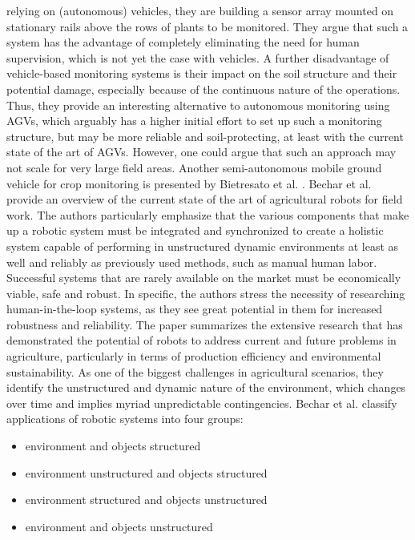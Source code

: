 \documentclass[english, master, utf8]{base/thesis_KBS}
\begin{document}
relying on (autonomous) vehicles, they are building a sensor array mounted on stationary rails above the rows of plants to be monitored. They argue that such a system has the
advantage of completely eliminating the need for human supervision, which is not yet the case with vehicles. A further disadvantage of vehicle-based monitoring systems is their
impact on the soil structure and their potential damage, especially because of the continuous nature of the operations. \cite{Virlet:2016} Thus, they provide an interesting
alternative to autonomous monitoring using AGVs, which arguably has a higher initial effort to set up such a monitoring structure, but may be more reliable and soil-protecting,
at least with the current state of the art of AGVs. However, one could argue that such an approach may not scale for very large field areas.\newline 
Another semi-autonomous mobile ground vehicle for crop monitoring is presented by Bietresato et al. \cite{Bietresato:2016}.\newline
Bechar et al. \cite{Bechar:2016} provide an overview of the current state of the art of agricultural robots for field work. The authors particularly emphasize that the various
components that make up a robotic system must be integrated and synchronized to create a holistic system capable of performing in unstructured dynamic environments at least as
well and reliably as previously used methods, such as manual human labor. Successful systems that are rarely available on the market must be economically viable, safe and robust.
\cite{Bechar:2016} In specific, the authors stress the necessity of researching human-in-the-loop systems, as they see great potential in them for increased robustness and
reliability. The paper summarizes the extensive research that has demonstrated the potential of robots to address current and future problems in agriculture, particularly in terms
of production efficiency and environmental sustainability. As one of the biggest challenges in agricultural scenarios, they identify the unstructured and dynamic nature of the
environment, which changes over time and implies myriad unpredictable contingencies. Bechar et al. classify applications of robotic systems into four groups:
\begin{itemize}
    \item environment and objects structured
    \item environment unstructured and objects structured
    \item environment structured and objects unstructured
    \item environment and objects unstructured
\end{itemize}
\end{document}
